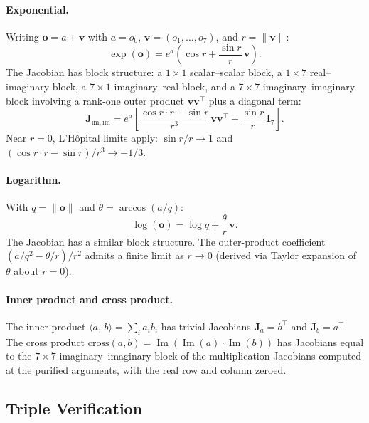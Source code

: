 \documentclass[11pt]{article}
\newcommand{\norm}[1]{\lVert #1 \rVert}
\newcommand{\ip}[2]{\langle #1,\, #2 \rangle}
\begin{document}
\paragraph{Exponential.}
Writing $\mathbf{o} = a + \mathbf{v}$ with $a = o_0$, $\mathbf{v} = (o_1,\ldots,o_7)$, and
$r = \norm{\mathbf{v}}$:
\begin{equation}
  \exp(\mathbf{o}) = e^a\!\left(\cos r + \frac{\sin r}{r}\,\mathbf{v}\right).
\end{equation}
The Jacobian has block structure: a $1\times 1$ scalar--scalar block, a
$1\times 7$ real--imaginary block, a $7\times 1$ imaginary--real block, and a
$7\times 7$ imaginary--imaginary block involving a rank-one outer product
$\mathbf{v}\mathbf{v}^\top$ plus a diagonal term:
\begin{equation}
  \mathbf{J}_{\mathrm{im,im}}
  = e^a\!\left[
      \frac{\cos r\cdot r - \sin r}{r^3}\,\mathbf{v}\mathbf{v}^\top
      + \frac{\sin r}{r}\,\mathbf{I}_7
    \right].
\end{equation}
Near $r=0$, L'H\^opital limits apply: $\sin r/r \to 1$ and
$(\cos r \cdot r - \sin r)/r^3 \to -1/3$.

\paragraph{Logarithm.}
With $q = \norm{\mathbf{o}}$ and $\theta = \arccos(a/q)$:
\begin{equation}
  \log(\mathbf{o}) = \log q + \frac{\theta}{r}\,\mathbf{v}.
\end{equation}
The Jacobian has a similar block structure.  The outer-product coefficient
$(a/q^2 - \theta/r)/r^2$ admits a finite limit as $r \to 0$ (derived via Taylor
expansion of $\theta$ about $r = 0$).

\paragraph{Inner product and cross product.}
The inner product $\ip{a}{b} = \sum_i a_i b_i$ has trivial Jacobians
$\mathbf{J}_a = b^\top$ and $\mathbf{J}_b = a^\top$.  The cross product
$\text{cross}(a,b) = \operatorname{Im}(\operatorname{Im}(a) \cdot \operatorname{Im}(b))$
has Jacobians equal to the $7\times 7$ imaginary--imaginary block of the
multiplication Jacobians computed at the purified arguments, with the real row
and column zeroed.

\subsection{Triple Verification}
\end{document}
